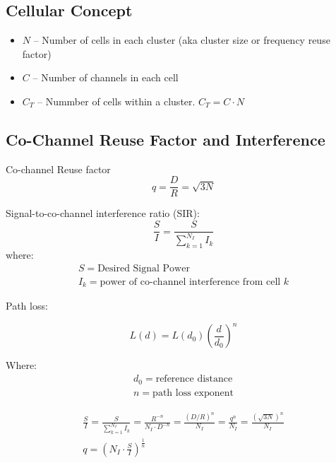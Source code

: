 \subsection{Cellular Concept}
\begin{itemize}
    \item $N$ -- Number of cells in each cluster (aka cluster size or frequency reuse factor)
    \item $C$ -- Number of channels in each cell
    \item $C_T$ -- Nummber of cells within a cluster. $C_T = C \cdot N$
\end{itemize}

\subsection{Co-Channel Reuse Factor and Interference}
Co-channel Reuse factor
\begin{equation}
    q = \frac{D}{R} = \sqrt{3N}
\end{equation}

Signal-to-co-channel interference ratio (SIR):
\begin{equation}
    \frac{S}{I} = \frac{S}{\sum_{k=1}^{N_I} I_k}
\end{equation}
where:
\begin{gather*}
    S = \text{Desired Signal Power} \\
    I_k = \text{power of co-channel interference from cell $k$}
\end{gather*}

Path loss:
\begin{multicols*}{2}
    \begin{equation}
        L(d) = L(d_0) \left( \frac{d}{d_0} \right)^n
    \end{equation}

    \columnbreak

    Where:
    \begin{gather*}
        d_0 = \text{reference distance}\\
        n = \text{path loss exponent}
    \end{gather*}
\end{multicols*}

\begin{gather}
    \frac{S}{I} = \frac{S}{\sum_{k=1}^{N_I} I_k} = \frac{R^{-n}}{N_I \cdot D^{-n}} = \frac{(D/R)^n}{N_I}
    = \frac{q^n}{N_I} = \frac{(\sqrt{3N})^n}{N_I} \\
    \boxed{q = \left(N_I \cdot \frac{S}{I}\right)^{\frac{1}{n}}}
\end{gather}

